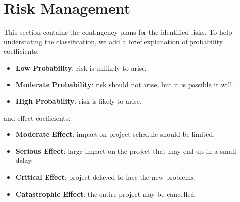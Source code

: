 \section{Risk Management}
This section contains the contingency plans for the identified risks. To help understating the classification, we add a brief explanation of probability coefficients:
\begin{itemize}
    \item \textbf{Low Probability}: risk is unlikely to arise.
    \item \textbf{Moderate Probability}: risk should not arise, but it is possible it will.
    \item \textbf{High Probability}: risk is likely to arise.
\end{itemize}
and effect coefficients:
\begin{itemize}
    \item \textbf{Moderate Effect}: impact on project schedule should be limited.
    \item \textbf{Serious Effect}: large impact on the project that may end up in a small delay.
    \item \textbf{Critical Effect}: project delayed to face the new problems.
    \item \textbf{Catastrophic Effect}: the entire project may be cancelled.
\end{itemize}

\bigskip

